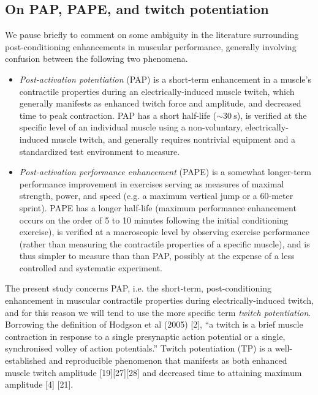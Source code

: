 \documentclass[utf8]{style/FrontiersinHarvard}
\begin{document}
\subsection{On PAP, PAPE, and twitch potentiation}
We pause briefly to comment on some ambiguity in the literature surrounding post-conditioning enhancements in muscular performance,
generally involving confusion between the following two phenomena.
\begin{itemize}

    \item \textit{Post-activation potentiation} (PAP) is a short-term enhancement in a muscle's contractile properties during an electrically-induced muscle twitch, which generally manifests as enhanced twitch force and amplitude, and decreased time to peak contraction.
    PAP has a short half-life ($ \sim \SI{30}{\second} $),
    is verified at the specific level of an individual muscle using a non-voluntary, electrically-induced muscle twitch, and generally requires nontrivial equipment and a standardized test environment to measure.

    \item \textit{Post-activation performance enhancement} (PAPE) is
    a somewhat longer-term performance improvement in exercises serving as measures of maximal strength, power, and speed (e.g. a maximum vertical jump or a 60-meter sprint).
    PAPE has a longer half-life (maximum performance enhancement occurs on the order of 5 to 10 minutes following the initial conditioning exercise),
    is verified at a macroscopic level by observing exercise performance (rather than measuring the contractile properties of a specific muscle),
    and is thus simpler to measure than than PAP, possibly at the expense of a less controlled and systematic experiment.

\end{itemize}

The present study concerns PAP, i.e. the short-term, post-conditioning enhancement in muscular contractile properties during electrically-induced twitch, and for this reason we will tend to use the more specific term \textit{twitch potentiation}.
Borrowing the definition of Hodgson et al (2005) [2],
``a twitch is a brief muscle contraction in response to a single presynaptic action potential or a single, synchronised volley of action potentials.''
Twitch potentiation (TP) is a well-established and reproducible phenomenon that manifests as both enhanced muscle twitch amplitude [19][27][28] and decreased time to attaining maximum amplitude [4] \cite{sale} [21].
\end{document}
